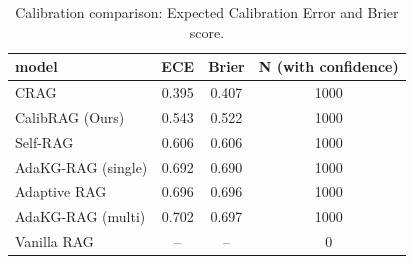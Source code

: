 \begin{table}
\caption{Calibration comparison: Expected Calibration Error and Brier score.}
\label{tab:calibration_results}
\begin{tabular}{lccc}
\toprule
model & ECE & Brier & N (with confidence) \\
\midrule
CRAG & 0.395 & 0.407 & 1000 \\
CalibRAG (Ours) & 0.543 & 0.522 & 1000 \\
Self-RAG & 0.606 & 0.606 & 1000 \\
AdaKG-RAG (single) & 0.692 & 0.690 & 1000 \\
Adaptive RAG & 0.696 & 0.696 & 1000 \\
AdaKG-RAG (multi) & 0.702 & 0.697 & 1000 \\
Vanilla RAG & -- & -- & 0 \\
\bottomrule
\end{tabular}
\end{table}
